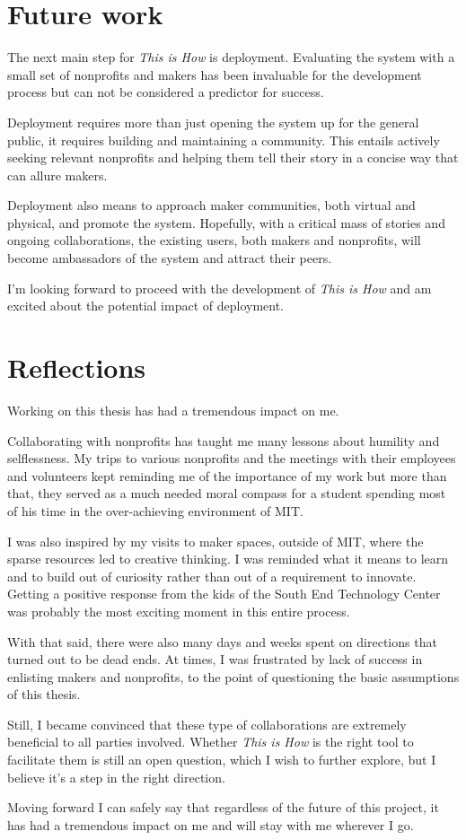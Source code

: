 \section{Future work}

The next main step for \textit{This is How} is deployment. Evaluating the system with a small set of nonprofits and makers has been invaluable for the development process but can not be considered a predictor for success.

Deployment requires more than just opening the system up for the general public, it requires building and maintaining a community. This entails actively seeking relevant nonprofits and helping them tell their story in a concise way that can allure makers. 

Deployment also means to approach maker communities, both virtual and physical, and promote the system. Hopefully, with a critical mass of stories and ongoing collaborations, the existing users, both makers and nonprofits, will become ambassadors of the system and attract their peers.

I'm looking forward to proceed with the development of \textit{This is How} and am excited about the potential impact of deployment.  

\section{Reflections}

Working on this thesis has had a tremendous impact on me.

Collaborating with nonprofits has taught me many lessons about humility and selflessness. My trips to various nonprofits and the meetings with their employees and volunteers kept reminding me of the importance of my work but more than that, they served as a much needed moral compass for a student spending most of his time in the over-achieving environment of MIT.

I was also inspired by my visits to maker spaces, outside of MIT, where the sparse resources led to creative thinking. I was reminded what it means to learn and to build out of curiosity rather than out of a requirement to innovate. Getting a positive response from the kids of the South End Technology Center was probably the most exciting moment in this entire process.

With that said, there were also many days and weeks spent on directions that turned out to be dead ends. At times, I was frustrated by lack of success in enlisting makers and nonprofits, to the point of questioning the basic assumptions of this thesis.

Still, I became convinced that these type of collaborations are extremely beneficial to all parties involved. Whether \textit{This is How} is the right tool to facilitate them is still an open question, which I wish to further explore, but I believe it's a step in the right direction. 

Moving forward I can safely say that regardless of the future of this project, it has had a tremendous impact on me and will stay with me wherever I  go.  